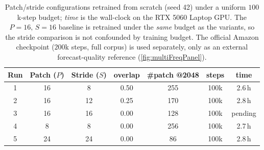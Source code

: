 \begin{table}[t]
    \centering
    \small
    \begin{tabular}{ccccccc}
        \toprule
        \textbf{Run} & \textbf{Patch ($P$)} & \textbf{Stride ($S$)} & \textbf{overlap} & \textbf{\#patch @2048} & \textbf{steps} & \textbf{time} \\
        \midrule
        1 & 16 & 8  & 0.50 & 255 & 100k & 2.6\,h \\
        2 & 16 & 12 & 0.25 & 170 & 100k & 2.8\,h \\
        3 & 16 & 16 & 0.00 & 128 & 100k & pending \\
        4 & 8  & 8  & 0.00 & 256 & 100k & 2.7\,h \\
        5 & 24 & 24 & 0.00 & 86  & 100k & 2.8\,h \\
        \bottomrule
    \end{tabular}
    \caption{Patch/stride configurations retrained from scratch (seed 42) under a uniform $100$k-step budget; \emph{time} is the wall-clock on the RTX 5060 Laptop GPU. The $P{=}16,\,S{=}16$ baseline is retrained under the \emph{same} budget as the variants, so the stride comparison is not confounded by training budget. The official Amazon checkpoint ($200$k steps, full corpus) is used separately, only as an external forecast-quality reference (\autoref{fig:multiFreqPanel}).}
    \label{tab:patchStride}
\end{table}

